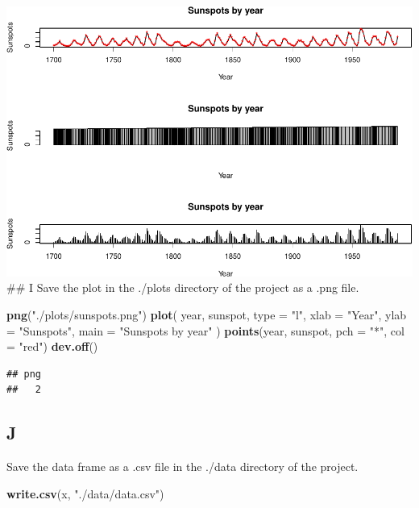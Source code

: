 \documentclass[
]{article}
\newenvironment{Shaded}{\begin{snugshade}}{\end{snugshade}}
\newcommand{\AttributeTok}[1]{\textcolor[rgb]{0.13,0.29,0.53}{#1}}
\newcommand{\FunctionTok}[1]{\textcolor[rgb]{0.13,0.29,0.53}{\textbf{#1}}}
\newcommand{\NormalTok}[1]{#1}
\newcommand{\StringTok}[1]{\textcolor[rgb]{0.31,0.60,0.02}{#1}}
\begin{document}
\includegraphics{es3_files/figure-latex/unnamed-chunk-8-1.pdf} \#\# I
Save the plot in the ./plots directory of the project as a .png file.

\begin{Shaded}
\begin{Highlighting}[]
\FunctionTok{png}\NormalTok{(}\StringTok{"./plots/sunspots.png"}\NormalTok{)}
\FunctionTok{plot}\NormalTok{(}
\NormalTok{  year,}
\NormalTok{  sunspot,}
  \AttributeTok{type =} \StringTok{"l"}\NormalTok{,}
  \AttributeTok{xlab =} \StringTok{"Year"}\NormalTok{,}
  \AttributeTok{ylab =} \StringTok{"Sunspots"}\NormalTok{,}
  \AttributeTok{main =} \StringTok{"Sunspots by year"}
\NormalTok{)}
\FunctionTok{points}\NormalTok{(year, sunspot, }\AttributeTok{pch =} \StringTok{"*"}\NormalTok{, }\AttributeTok{col =} \StringTok{"red"}\NormalTok{)}
\FunctionTok{dev.off}\NormalTok{()}
\end{Highlighting}
\end{Shaded}

\begin{verbatim}
## png 
##   2
\end{verbatim}

\hypertarget{j}{%
\subsection{J}\label{j}}

Save the data frame as a .csv file in the ./data directory of the
project.

\begin{Shaded}
\begin{Highlighting}[]
\FunctionTok{write.csv}\NormalTok{(x, }\StringTok{"./data/data.csv"}\NormalTok{)}
\end{Highlighting}
\end{Shaded}
\end{document}
